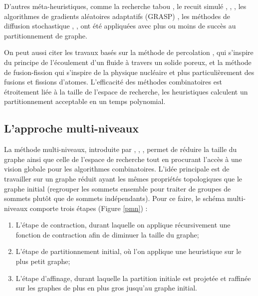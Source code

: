 D'autres méta-heuristiques, comme la recherche tabou \citep{BattitiBertossi1999}, le recuit simulé \citep{Bichot2004}, \citep{Johnson1989}, \citep{Williams1991}, les algorithmes de gradients aléatoires adaptatifs (GRASP) \citep{AreibiYang2004}, les méthodes de diffusion stochastique \citep{TaoZhao1993}, \citep{Wan2005}, ont été appliquées avec plus ou moins de succès au partitionnement de graphe.

On peut aussi citer les travaux basés sur la méthode de percolation \citep{MeyerhenkeSchamberger2006}, \citep{Pellegrini2007} qui s'inspire du principe de l'écoulement d'un fluide à travers un solide poreux, et la méthode de fusion-fission \citep{Bichot2007} qui s'inspire de la physique nucléaire et plus particulièrement des fusions et fissions d'atomes.
L'efficacité des méthodes combinatoires est étroitement liée à la taille de l'espace de recherche, les heuristiques calculent un partitionnement acceptable en un temps polynomial.


\subsection*{L'approche multi-niveaux}
La méthode multi-niveaux, introduite par \citep{BarnardSimon1994}, \citep{HendricksonLeland1995b}, \citep{VanDriesscheRoose1994}, permet de réduire la taille du graphe ainsi que celle de l'espace de recherche tout en procurant l'accès à une vision globale pour les algorithmes
combinatoires. L'idée principale est de travailler sur un graphe réduit ayant les mêmes propriétés topologiques que le graphe initial (regrouper les sommets ensemble pour traiter de groupes de sommets plutôt que de sommets indépendants).
Pour ce faire, le schéma multi-niveaux comporte trois étapes (Figure \ref{pmn}) :
\begin{enumerate}
	\item  L'étape de contraction, durant laquelle on applique récursivement une fonction de contraction afin de diminuer la taille du graphe;
	\item  L'étape de partitionnement initial, où l'on applique une heuristique sur le plus petit graphe;
	\item  L'étape d'affinage, durant laquelle la partition initiale est projetée et raffinée sur les graphes de plus en plus gros jusqu'au graphe initial.
\end{enumerate}
  
